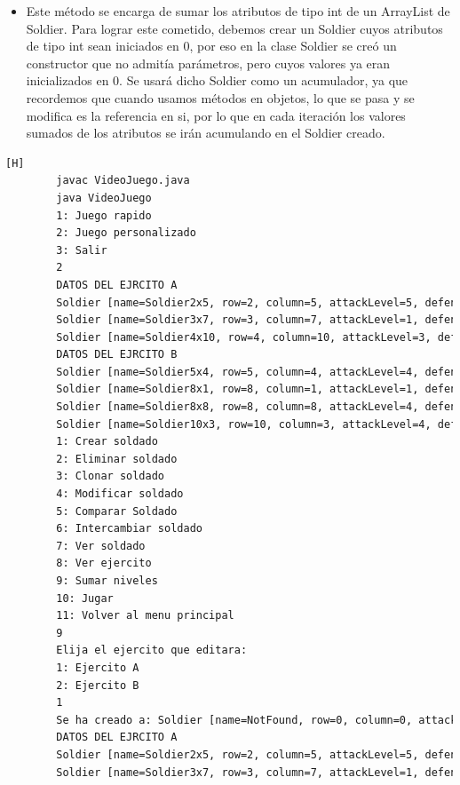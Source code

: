 \documentclass{article}
\begin{document}
	\begin{itemize}	
		\item Este método se encarga de sumar los atributos de tipo int de un ArrayList de Soldier. Para lograr este cometido, debemos crear un Soldier cuyos atributos de tipo int sean iniciados en 0, por eso en la clase Soldier se creó un constructor que no admitía parámetros, pero cuyos valores ya eran inicializados en 0. Se usará dicho Soldier como un acumulador, ya que recordemos que cuando usamos métodos en objetos, lo que se pasa y se modifica es la referencia en si, por lo que en cada iteración los valores sumados de los atributos se irán acumulando en el Soldier creado.
	\end{itemize}
	
	\begin{lstlisting}[language=bash,caption={Compilando y probando el metodo sumOfAttributes  }][H]
		javac VideoJuego.java
		java VideoJuego
		1: Juego rapido
		2: Juego personalizado
		3: Salir
		2
		DATOS DEL EJRCITO A
		Soldier [name=Soldier2x5, row=2, column=5, attackLevel=5, defenseLevel=5, actualLife=5, speed=0, attitude=Repose, current=true]
		Soldier [name=Soldier3x7, row=3, column=7, attackLevel=1, defenseLevel=5, actualLife=5, speed=0, attitude=Repose, current=true]
		Soldier [name=Soldier4x10, row=4, column=10, attackLevel=3, defenseLevel=3, actualLife=5, speed=0, attitude=Repose, current=true]
		DATOS DEL EJRCITO B
		Soldier [name=Soldier5x4, row=5, column=4, attackLevel=4, defenseLevel=3, actualLife=4, speed=0, attitude=Repose, current=true]
		Soldier [name=Soldier8x1, row=8, column=1, attackLevel=1, defenseLevel=4, actualLife=4, speed=0, attitude=Repose, current=true]
		Soldier [name=Soldier8x8, row=8, column=8, attackLevel=4, defenseLevel=4, actualLife=5, speed=0, attitude=Repose, current=true]
		Soldier [name=Soldier10x3, row=10, column=3, attackLevel=4, defenseLevel=2, actualLife=3, speed=0, attitude=Repose, current=true]
		1: Crear soldado
		2: Eliminar soldado
		3: Clonar soldado
		4: Modificar soldado
		5: Comparar Soldado
		6: Intercambiar soldado
		7: Ver soldado
		8: Ver ejercito
		9: Sumar niveles
		10: Jugar
		11: Volver al menu principal
		9
		Elija el ejercito que editara:
		1: Ejercito A
		2: Ejercito B
		1
		Se ha creado a: Soldier [name=NotFound, row=0, column=0, attackLevel=9, defenseLevel=13, actualLife=15, speed=0, attitude=repose, current=true]
		DATOS DEL EJRCITO A
		Soldier [name=Soldier2x5, row=2, column=5, attackLevel=5, defenseLevel=5, actualLife=5, speed=0, attitude=Repose, current=true]
		Soldier [name=Soldier3x7, row=3, column=7, attackLevel=1, defenseLevel=5, actualLife=5, speed=0, attitude=Repose, current=true]

\end{lstlisting}
\end{document}
